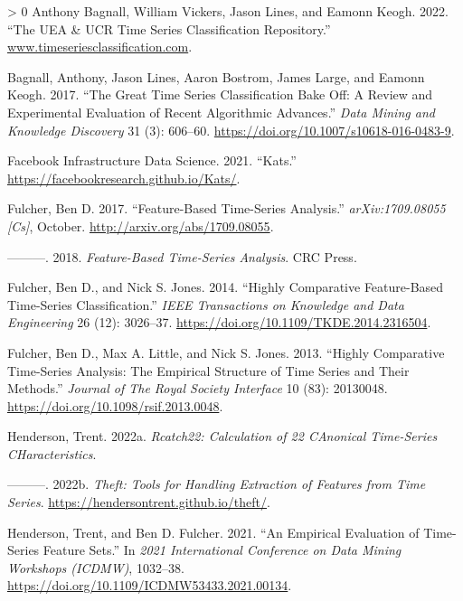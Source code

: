 \documentclass{article}
\newlength{\cslhangindent}
\newenvironment{CSLReferences}[3] %
 {%
  \setlength{\parindent}{0pt}
  \ifodd #1 \everypar{\setlength{\hangindent}{\cslhangindent}}\ignorespaces\fi
  \ifnum #2 > 0
  \setlength{\parskip}{#2\baselineskip}
  \fi
 }%
 {}
\begin{document}
\hypertarget{refs}{}
\begin{CSLReferences}{1}{0}
\leavevmode\hypertarget{ref-UEA_UCR_Repo}{}%
Anthony Bagnall, William Vickers, Jason Lines, and Eamonn Keogh. 2022. {``The UEA \& UCR Time Series Classification Repository.''} \href{https://www.timeseriesclassification.com}{www.timeseriesclassification.com}.

\leavevmode\hypertarget{ref-bagnallGreatTimeSeries2017}{}%
Bagnall, Anthony, Jason Lines, Aaron Bostrom, James Large, and Eamonn Keogh. 2017. {``The Great Time Series Classification Bake Off: A Review and Experimental Evaluation of Recent Algorithmic Advances.''} \emph{Data Mining and Knowledge Discovery} 31 (3): 606--60. \url{https://doi.org/10.1007/s10618-016-0483-9}.

\leavevmode\hypertarget{ref-Kats}{}%
Facebook Infrastructure Data Science. 2021. {``Kats.''} \url{https://facebookresearch.github.io/Kats/}.

\leavevmode\hypertarget{ref-fulcherFeaturebasedTimeseriesAnalysis2017}{}%
Fulcher, Ben D. 2017. {``Feature-Based Time-Series Analysis.''} \emph{arXiv:1709.08055 {[}Cs{]}}, October. \url{http://arxiv.org/abs/1709.08055}.

\leavevmode\hypertarget{ref-fulcherFeatureBasedTimeSeriesAnalysis2018}{}%
---------. 2018. \emph{Feature-Based Time-Series Analysis}. {CRC Press}.

\leavevmode\hypertarget{ref-fulcherHighlyComparativeFeaturebased2014}{}%
Fulcher, Ben D., and Nick S. Jones. 2014. {``Highly Comparative Feature-Based Time-Series Classification.''} \emph{IEEE Transactions on Knowledge and Data Engineering} 26 (12): 3026--37. \url{https://doi.org/10.1109/TKDE.2014.2316504}.

\leavevmode\hypertarget{ref-fulcherHighlyComparativeTimeseries2013}{}%
Fulcher, Ben D., Max A. Little, and Nick S. Jones. 2013. {``Highly Comparative Time-Series Analysis: The Empirical Structure of Time Series and Their Methods.''} \emph{Journal of The Royal Society Interface} 10 (83): 20130048. \url{https://doi.org/10.1098/rsif.2013.0048}.

\leavevmode\hypertarget{ref-Rcatch22}{}%
Henderson, Trent. 2022a. \emph{Rcatch22: Calculation of 22 CAnonical Time-Series CHaracteristics}.

\leavevmode\hypertarget{ref-theft}{}%
---------. 2022b. \emph{Theft: Tools for Handling Extraction of Features from Time Series}. \url{https://hendersontrent.github.io/theft/}.

\leavevmode\hypertarget{ref-hendersonEmpiricalEvaluationTimeSeries2021}{}%
Henderson, Trent, and Ben D. Fulcher. 2021. {``An {Empirical Evaluation} of {Time-Series Feature Sets}.''} In \emph{2021 {International Conference} on {Data Mining Workshops} ({ICDMW})}, 1032--38. \url{https://doi.org/10.1109/ICDMW53433.2021.00134}.


\end{CSLReferences}
\end{document}
